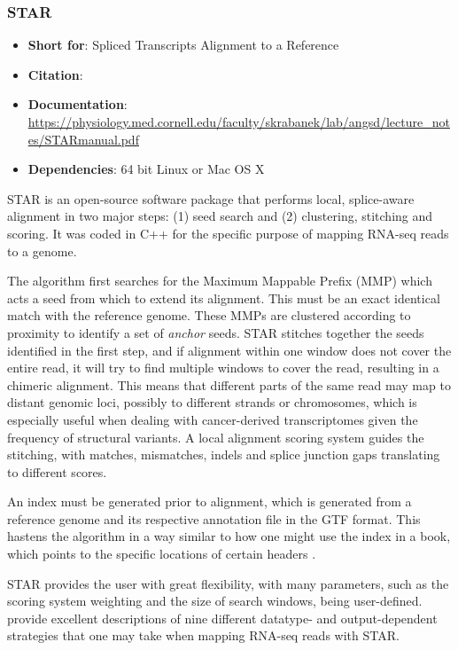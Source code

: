 \subsubsection{STAR}
\begin{itemize}\itemsep-0.5em
\item[] \textbf{Short for}: 				Spliced Transcripts Alignment to a Reference
\item[] \textbf{Citation}: 				\cite{Dobin2013}
\item[] \textbf{Documentation}: 	\url{https://physiology.med.cornell.edu/faculty/skrabanek/lab/angsd/lecture_notes/STARmanual.pdf}
\item[] \textbf{Dependencies}: 64 bit Linux or Mac OS X
\end{itemize}

STAR is an open-source software package that performs local, splice-aware alignment in two major steps: (1) seed search and (2) clustering, stitching and scoring. It was coded in C++ for the specific purpose of mapping RNA-seq reads to a genome.

The algorithm first searches for the Maximum Mappable Prefix (MMP) which acts a seed from which to extend its alignment. This must be an exact identical match with the reference genome. These MMPs are clustered according to proximity to identify a set of \textit{anchor} seeds. STAR stitches together the seeds identified in the first step, and if alignment within one window does not cover the entire read, it will try to find multiple windows to cover the read, resulting in a chimeric alignment. This means that different parts of the same read may map to distant genomic loci, possibly to different strands or chromosomes, which is especially useful when dealing with cancer-derived transcriptomes given the frequency of structural variants. A local alignment scoring system guides the stitching, with matches, mismatches, indels and splice junction gaps translating to different scores.

An index must be generated prior to alignment, which is generated from a reference genome and its respective annotation file in the GTF format. This hastens the algorithm in a way similar to how one might use the index in a book, which points to the specific locations of certain headers \citep{trapnell2009map}.

STAR provides the user with great flexibility, with many parameters, such as  the scoring system weighting and the size of search windows, being user-defined. \cite{dobin2015mapping} provide excellent descriptions of nine different datatype- and output-dependent strategies that one may take when mapping RNA-seq reads with STAR. 

